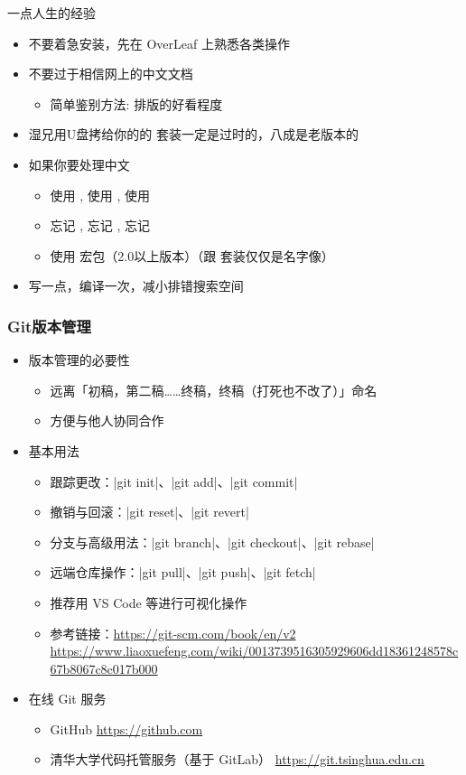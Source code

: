 \begin{frame}{一点人生的经验}
  \begin{itemize}
    \item 不要着急安装，先在 OverLeaf 上熟悉各类操作
    \item 不要过于相信网上的中文文档
      \begin{itemize}
        \item 简单鉴别方法: 排版的好看程度
      \end{itemize}
    \item 湿兄用U盘拷给你的的 \CTeX 套装一定是过时的，\ThuThesis 八成是老版本的
    \item 如果你要处理中文
      \begin{itemize}
        \item 使用 \XeLaTeX, 使用 \XeLaTeX, 使用 \XeLaTeX
        \item 忘记 , 忘记 , 忘记 
        \item 使用  宏包（2.0以上版本）（跟 \CTeX 套装仅仅是名字像）
      \end{itemize}
    \item 写一点，编译一次，减小排错搜索空间
  \end{itemize}
\end{frame}

\begin{frame}[fragile]
  \frametitle{Git版本管理}
  \begin{itemize}
    \item 版本管理的必要性
      \begin{itemize}
        \item 远离「初稿，第二稿……终稿，终稿（打死也不改了）」命名
        \item 方便与他人协同合作
      \end{itemize}
    \item 基本用法
      \begin{itemize}
        \item 跟踪更改：|git init|、|git add|、|git commit|
        \item 撤销与回滚：|git reset|、|git revert|
        \item 分支与高级用法：|git branch|、|git checkout|、|git rebase|
        \item 远端仓库操作：|git pull|、|git push|、|git fetch|
        \item 推荐用 VS Code 等进行可视化操作
        \item 参考链接：\url{https://git-scm.com/book/en/v2}
          \url{https://www.liaoxuefeng.com/wiki/0013739516305929606dd18361248578c67b8067c8c017b000}
      \end{itemize}
    \item 在线 Git 服务
      \begin{itemize}
        \item GitHub \url{https://github.com}
        \item 清华大学代码托管服务（基于 GitLab） \url{https://git.tsinghua.edu.cn}
      \end{itemize}
  \end{itemize}
  \end{frame}

